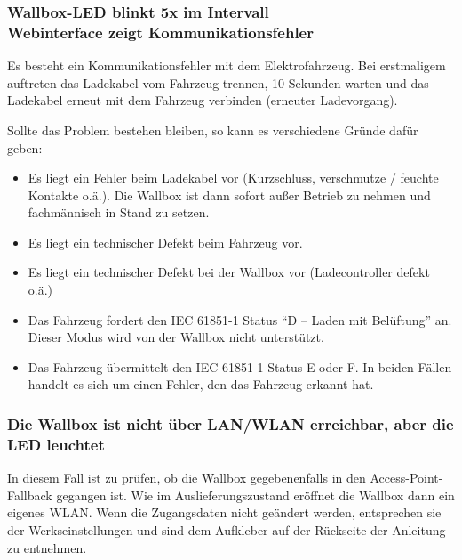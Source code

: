 \documentclass[a4paper,10pt]{article}
\begin{document}
\begin{multicols*}{2}
	\subsubsection*{Wallbox-LED blinkt 5x im Intervall \\ Webinterface zeigt Kommunikationsfehler}
	Es besteht ein Kommunikationsfehler mit dem Elektrofahrzeug. Bei erstmaligem
	auftreten das Ladekabel vom Fahrzeug trennen, 10 Sekunden warten und das
	Ladekabel erneut mit dem Fahrzeug verbinden (erneuter Ladevorgang).

	Sollte das Problem bestehen bleiben, so kann es verschiedene Gründe dafür
	geben:
	\begin{itemize}
		\item Es liegt ein Fehler beim Ladekabel vor (Kurzschluss, verschmutze / feuchte
		      Kontakte o.ä.). Die Wallbox ist dann sofort außer Betrieb zu nehmen und
		      fachmännisch in Stand zu setzen.
		\item Es liegt ein technischer Defekt beim Fahrzeug vor.
		\item Es liegt ein technischer Defekt bei der Wallbox vor (Ladecontroller defekt o.ä.)
		\item Das Fahrzeug fordert den IEC 61851-1 Status \enquote{D – Laden mit Belüftung}
		      an. Dieser Modus wird von der Wallbox nicht unterstützt.
		\item Das Fahrzeug übermittelt den IEC 61851-1 Status E oder F. In beiden Fällen
		      handelt es sich um einen Fehler, den das Fahrzeug erkannt hat.
	\end{itemize}

	\subsubsection*{Die Wallbox ist nicht über LAN/WLAN erreichbar, aber die LED leuchtet}
	In diesem Fall ist zu prüfen, ob die Wallbox gegebenenfalls in den Access-Point-Fallback
	gegangen ist. Wie im Auslieferungszustand eröffnet die Wallbox dann ein eigenes
	WLAN. Wenn die Zugangsdaten nicht geändert werden, entsprechen sie der Werkseinstellungen und sind dem
	Aufkleber auf der Rückseite der Anleitung zu entnehmen.


\end{multicols*}
\end{document}
